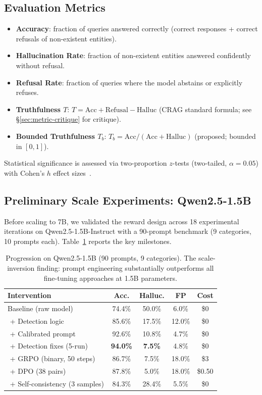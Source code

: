 \documentclass[11pt]{article}
\begin{document}
\subsection{Evaluation Metrics}
\label{sec:metrics}

\begin{itemize}[leftmargin=1.5em]
    \item \textbf{Accuracy}: fraction of queries answered correctly (correct responses + correct refusals of non-existent entities).
    \item \textbf{Hallucination Rate}: fraction of non-existent entities answered confidently without refusal.
    \item \textbf{Refusal Rate}: fraction of queries where the model abstains or explicitly refuses.
    \item \textbf{Truthfulness $T$}: $T = \text{Acc} + \text{Refusal} - \text{Halluc}$ (CRAG standard formula; see \S\ref{sec:metric-critique} for critique).
    \item \textbf{Bounded Truthfulness $T_b$}: $T_b = \text{Acc}/(\text{Acc} + \text{Halluc})$ (proposed; bounded in $[0,1]$).
\end{itemize}

Statistical significance is assessed via two-proportion $z$-tests (two-tailed, $\alpha=0.05$) with Cohen's $h$ effect sizes~\cite{cohen1988statistical}.

\subsection{Preliminary Scale Experiments: Qwen2.5-1.5B}
\label{sec:qwen}

Before scaling to 7B, we validated the reward design across 18 experimental iterations on Qwen2.5-1.5B-Instruct with a 90-prompt benchmark (9 categories, 10 prompts each). Table~\ref{tab:progression} reports the key milestones.

\begin{table}[t]
\centering
\caption{Progression on Qwen2.5-1.5B (90 prompts, 9 categories). The scale-inversion finding: prompt engineering substantially outperforms all fine-tuning approaches at 1.5B parameters.}
\label{tab:progression}
\begin{tabular}{lcccc}
\toprule
\textbf{Intervention} & \textbf{Acc.} & \textbf{Halluc.} & \textbf{FP} & \textbf{Cost} \\
\midrule
Baseline (raw model) & 74.4\% & 50.0\% & 6.0\% & \$0 \\
\,\,+ Detection logic & 85.6\% & 17.5\% & 12.0\% & \$0 \\
\,\,+ Calibrated prompt & 92.6\% & 10.8\% & 4.7\% & \$0 \\
\,\,+ Detection fixes (5-run) & \textbf{94.0\%} & \textbf{7.5\%} & 4.8\% & \$0 \\
\midrule
\,\,+ GRPO (binary, 50 steps) & 86.7\% & 7.5\% & 18.0\% & \$3 \\
\,\,+ DPO (38 pairs) & 87.8\% & 5.0\% & 18.0\% & \$0.50 \\
\,\,+ Self-consistency (3 samples) & 84.3\% & 28.4\% & 5.5\% & \$0 \\
\bottomrule
\end{tabular}
\end{table}
\end{document}
